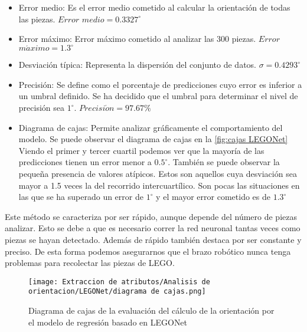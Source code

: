 \begin{itemize}
\item Error medio: Es el error medio cometido al calcular la orientación de todas las piezas. $Error$ $medio = 0.3327^{\circ}$
\item Error máximo: Error máximo cometido al analizar las 300 piezas. $Error$ $m \acute{a} ximo = 1.3^{\circ}$
\item Desviación típica: Representa la dispersión del conjunto de datos. $\sigma = 0.4293^{\circ}$
\item Precisión: Se define como el porcentaje de predicciones cuyo error es inferior a un umbral definido. Se ha decidido que el umbral para determinar el nivel de precisión sea $1^{\circ}$. $Precisi \acute{o} n = 97.67\%$
\item Diagrama de cajas: Permite analizar gráficamente el comportamiento del modelo. Se puede observar el diagrama de cajas en la \autoref{fig:cajas LEGONet} Viendo el primer y tercer cuartil podemos ver que la mayoría de las predicciones tienen un error menor a $0.5^{\circ}$. También se puede observar la pequeña presencia de valores atípicos. Estos son aquellos cuya desviación sea mayor a 1.5 veces la del recorrido intercuartílico. Son pocas las situaciones en las que se ha superado un error de $1^{\circ}$ y el mayor error cometido es de $1.3^{\circ}$
\end{itemize}

Este método se caracteriza por ser rápido, aunque depende del número de piezas analizar. Esto se debe a que es necesario correr la red neuronal tantas veces como piezas se hayan detectado. Además de rápido también destaca por ser constante y preciso. De esta forma podemos asegurarnos que el brazo robótico nunca tenga problemas para recolectar las piezas de LEGO.

\begin{figure}[ht] %
	\centering
	\texttt{[image: Extraccion de atributos/Analisis de orientacion/LEGONet/diagrama de cajas.png]}
	\caption[Diagrama de cajas de la orientación mediante LEGONet]{Diagrama de cajas de la evaluación del cálculo de la orientación por el modelo de regresión basado en LEGONet}
	\label{fig:cajas LEGONet}
	\vspace{-5pt}
\end{figure}


